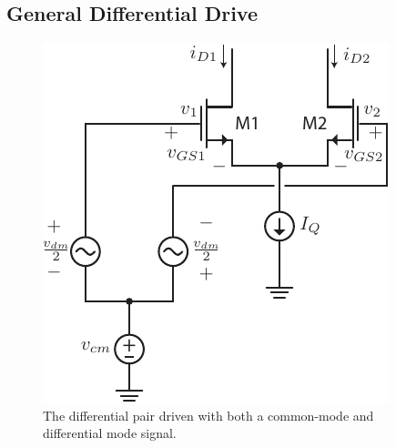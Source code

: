 \subsection{General Differential Drive}
\begin{figure}[tb]
\begin{center}
\includegraphics[scale=1]{Diff_Pair_Diff_CM.pdf}
\end{center}
\caption{The differential pair driven with both a common-mode and differential mode signal.} \label{fig:Diff_Pair_Diff_CM.pdf}
\end{figure}

